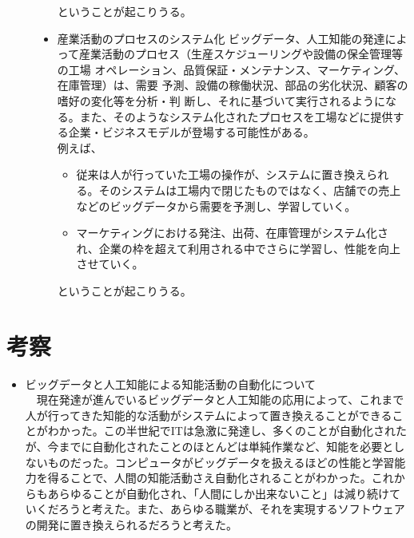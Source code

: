 \documentclass[a4paper,12pt]{jarticle}
\begin{document}
\begin{description}
\begin{itemize}
\begin{itemize}
   \end{itemize}
ということが起こりうる。
  \item 産業活動のプロセスのシステム化
   ビッグデータ、人工知能の発達によって産業活動のプロセス（生産スケジューリングや設備の保全管理等の工場 オペレーション、品質保証・メンテナンス、マーケティング、在庫管理）は、需要 予測、設備の稼働状況、部品の劣化状況、顧客の嗜好の変化等を分析・判 断し、それに基づいて実行されるようになる。また、そのようなシステム化されたプロセスを工場などに提供する企業・ビジネスモデルが登場する可能性がある。\\
例えば、
   \begin{itemize}
    \item 従来は人が行っていた工場の操作が、システムに置き換えられる。そのシステムは工場内で閉じたものではなく、店舗での売上などのビッグデータから需要を予測し、学習していく。
    \item マーケティングにおける発注、出荷、在庫管理がシステム化され、企業の枠を超えて利用される中でさらに学習し、性能を向上させていく。
   \end{itemize}
ということが起こりうる。
 \end{itemize}
\end{description}
\newpage
\section{考察}
\begin{itemize}
 \item ビッグデータと人工知能による知能活動の自動化について\\
　現在発達が進んでいるビッグデータと人工知能の応用によって、これまで人が行ってきた知能的な活動がシステムによって置き換えることができることがわかった。この半世紀でITは急激に発達し、多くのことが自動化されたが、今までに自動化されたことのほとんどは単純作業など、知能を必要としないものだった。コンピュータがビッグデータを扱えるほどの性能と学習能力を得ることで、人間の知能活動さえ自動化されることがわかった。これからもあらゆることが自動化され、「人間にしか出来ないこと」は減り続けていくだろうと考えた。また、あらゆる職業が、それを実現するソフトウェアの開発に置き換えられるだろうと考えた。
\end{itemize}
\end{document}
